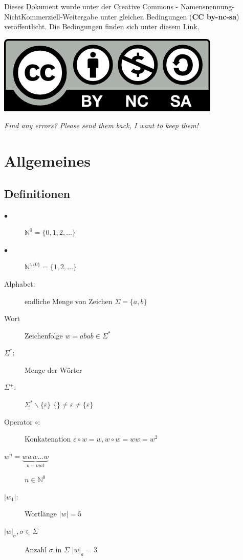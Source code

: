 \documentclass{scrartcl}
\begin{document}

\begin{shaded}
Dieses Dokument wurde unter der Creative Commons - Namensnennung-NichtKommerziell-Weitergabe unter gleichen Bedingungen (\textbf{CC by-nc-sa}) veröffentlicht. Die Bedingungen finden sich unter \href{http://creativecommons.org/licenses/by-nc-sa/3.0/de}{diesem Link}. \\
\centerline{\includegraphics[scale=1]{../cc-by-nc-sa.png} }
\end{shaded}

\textit{Find any errors? Please send them back, I want to keep them!}

\section*{Allgemeines}
\subsection*{Definitionen}
\begin{description}
    \item[$\bullet$] $\mathds{N}^0 = \{0,1,2,\dots\}$
    \item[$\bullet$] $\mathds{N}^{\backslash\{0\}}=\{1,2,\dots\}$
    \item[Alphabet:] endliche Menge von Zeichen {\tiny $\Sigma=\{a,b\}$}
    \item[Wort] Zeichenfolge {\tiny $w=abab \in\Sigma^*$}
    \item[$\Sigma^*$:] Menge der Wörter
    \item[$\Sigma^+$:] $\Sigma^* \backslash\{\varepsilon\}$ {\tiny $\{\}\not= \varepsilon \not=\{\varepsilon\}$}
    \item[Operator $\circ$:]Konkatenation {\tiny $\varepsilon \circ w = w, w\circ w=ww=w^2$}
    \item[$w^n=\underset{n-mal}{\underbrace{www\dots w}}$] $n \in \mathds{N}^0$
    \item[$|w_1|$:] Wortlänge {\tiny $|w|=5$}
    \item[$|w|_\sigma, \sigma\in\Sigma$] Anzahl $\sigma$ in $\Sigma$ {\tiny $|w|_a=3$}
\end{description}
\end{document}
